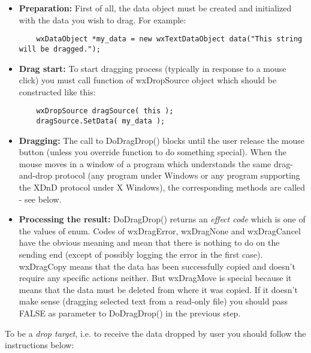 \begin{itemize}\itemsep=0pt
\item {\bf Preparation:} First of all, the data object must be created and
initialized with the data you wish to drag. For example:

\begin{verbatim}
	wxDataObject *my_data = new wxTextDataObject data("This string will be dragged.");
\end{verbatim}
\item{\bf Drag start:} To start dragging process (typically in response to a
mouse click) you must call  function
of wxDropSource object which should be constructed like this:

\begin{verbatim}
	wxDropSource dragSource( this );
	dragSource.SetData( my_data );
\end{verbatim}
\item {\bf Dragging:} The call to DoDragDrop() blocks until the user release the
mouse button (unless you override  function
to do something special). When the mouse moves in a window of a program which understands the
same drag-and-drop protocol (any program under Windows or any program supporting the
XDnD protocol under X Windows), the corresponding  methods
are called - see below.
\item {\bf Processing the result:} DoDragDrop() returns an {\it effect code} which
is one of the values of  enum. Codes
of wxDragError, wxDragNone and wxDragCancel have the obvious meaning and mean
that there is nothing to do on the sending end (except of possibly logging the
error in the first case). wxDragCopy means that the data has been successfully
copied and doesn't require any specific actions neither. But wxDragMove is
special because it means that the data must be deleted from where it was
copied. If it doesn't make sense (dragging selected text from a read-only
file) you should pass FALSE as parameter to DoDragDrop() in the previous step.
\end{itemize}

To be a {\it drop target}, i.e. to receive the data dropped by user you should
follow the instructions below:


